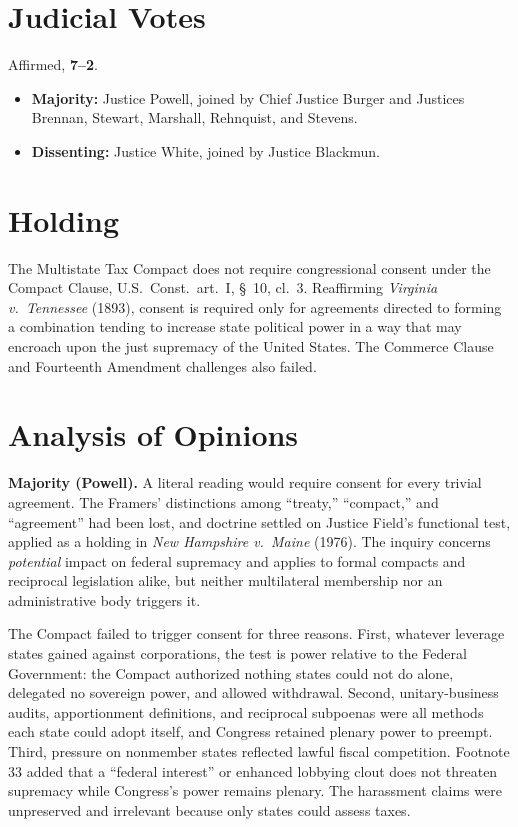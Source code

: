 \documentclass[12pt]{article}
\begin{document}
\section{Judicial Votes}

Affirmed, \textbf{7--2}.
\begin{itemize}
\item \textbf{Majority:} Justice Powell, joined by Chief Justice Burger and Justices Brennan, Stewart, Marshall, Rehnquist, and Stevens.
\item \textbf{Dissenting:} Justice White, joined by Justice Blackmun.
\end{itemize}

\section{Holding}

The Multistate Tax Compact does not require congressional consent under the Compact Clause, U.S.\ Const.\ art.\ I, \S\ 10, cl.\ 3. Reaffirming \textit{Virginia v.\ Tennessee} (1893), consent is required only for agreements directed to forming a combination tending to increase state political power in a way that may encroach upon the just supremacy of the United States. The Commerce Clause and Fourteenth Amendment challenges also failed.

\section{Analysis of Opinions}

\textbf{Majority (Powell).} A literal reading would require consent for every trivial agreement. The Framers' distinctions among ``treaty,'' ``compact,'' and ``agreement'' had been lost, and doctrine settled on Justice Field's functional test, applied as a holding in \textit{New Hampshire v.\ Maine} (1976). The inquiry concerns \textit{potential} impact on federal supremacy and applies to formal compacts and reciprocal legislation alike, but neither multilateral membership nor an administrative body triggers it.

The Compact failed to trigger consent for three reasons. First, whatever leverage states gained against corporations, the test is power relative to the Federal Government: the Compact authorized nothing states could not do alone, delegated no sovereign power, and allowed withdrawal. Second, unitary-business audits, apportionment definitions, and reciprocal subpoenas were all methods each state could adopt itself, and Congress retained plenary power to preempt. Third, pressure on nonmember states reflected lawful fiscal competition. Footnote 33 added that a ``federal interest'' or enhanced lobbying clout does not threaten supremacy while Congress's power remains plenary. The harassment claims were unpreserved and irrelevant because only states could assess taxes.
\end{document}
